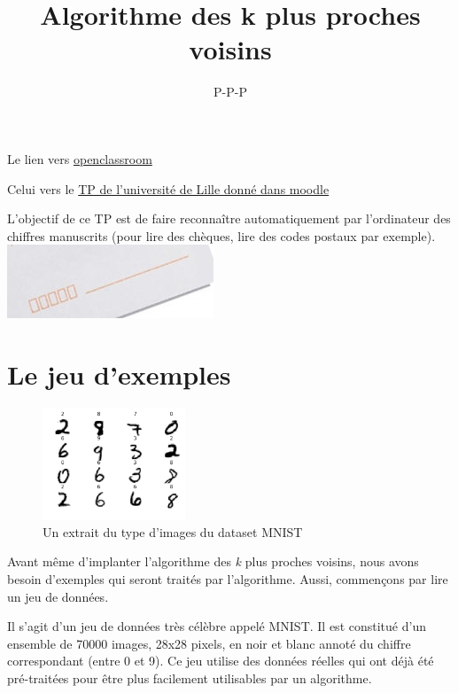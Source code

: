\documentclass[10pt,lang=french]{scrartcl}
\title{Algorithme des k plus proches voisins}
\author{P-P-P}
\begin{document}
    
    
    \maketitle


Le lien vers
\href{https://openclassrooms.com/fr/courses/4011851-initiez-vous-au-machine-learning/4022441-tp-entrainez-le-modele-des-k-plus-proches-voisins-k-nn}{openclassroom}

Celui vers le
\href{http://www.grappa.univ-lille3.fr/~ppreux/ensg/miashs/l3-ap/tps/kppv/}{TP
de l'université de Lille donné dans moodle}

L'objectif de ce TP est de faire reconnaître automatiquement par
l'ordinateur des chiffres manuscrits (pour lire des chèques, lire des
codes postaux par exemple). \includegraphics{lettres.jpg}

    \tableofcontents
    
\section{Le  jeu d'exemples}

    \begin{figure}
    	\centering
    		\includegraphics[width=0.38\textwidth]{extrait_MNIST2.png}
    		\caption{\scriptsize Un extrait du type d'images du dataset MNIST}
    \end{figure}
    
    Avant même d'implanter l'algorithme des \emph{k} plus proches voisins,
    nous avons besoin d'exemples qui seront traités par l'algorithme. Aussi,
    commençons par lire un jeu de données.
    
    Il s'agit d'un jeu de données très célèbre appelé MNIST. Il est
    constitué d'un ensemble de 70000 images, 28x28 pixels, en noir et blanc
    annoté du chiffre correspondant (entre 0 et 9). Ce jeu utilise des
    données réelles qui ont déjà été pré-traitées pour être plus facilement
    utilisables par un algorithme.
    
\end{document}
